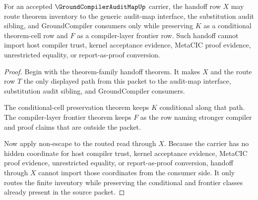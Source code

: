 \begin{theorem}
\label{thm:ground-compiler-audit-map-frontier-handoff-nonescape}
For an accepted $\GroundCompilerAuditMapUp$ carrier, the handoff row $X$ may route theorem inventory to the generic audit-map interface, the substitution audit sibling, and GroundCompiler consumers only while preserving $K$ as a conditional theorem-cell row and $F$ as a compiler-layer frontier row. Such handoff cannot import host compiler trust, kernel acceptance evidence, MetaCIC proof evidence, unrestricted equality, or report-as-proof conversion.
\end{theorem}
\begin{proof}
Begin with the theorem-family handoff theorem. It makes $X$ and the route row $T$ the only displayed path from this packet to the audit-map interface, substitution audit sibling, and GroundCompiler consumers.

The conditional-cell preservation theorem keeps $K$ conditional along that path. The compiler-layer frontier theorem keeps $F$ as the row naming stronger compiler and proof claims that are outside the packet.

Now apply non-escape to the routed read through $X$. Because the carrier has no hidden coordinate for host compiler trust, kernel acceptance evidence, MetaCIC proof evidence, unrestricted equality, or report-as-proof conversion, handoff through $X$ cannot import those coordinates from the consumer side. It only routes the finite inventory while preserving the conditional and frontier classes already present in the source packet.
\end{proof}

